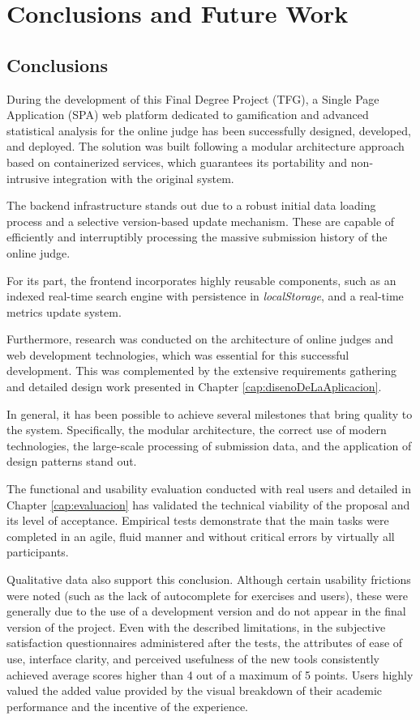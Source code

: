 \chapter{Conclusions and Future Work}
\label{cap:conclusions}

\section{Conclusions}

During the development of this Final Degree Project (TFG), a Single Page Application (SPA) web platform dedicated to gamification and advanced statistical analysis for the online judge \aer has been successfully designed, developed, and deployed. The solution was built following a modular architecture approach based on containerized services, which guarantees its portability and non-intrusive integration with the original \aer system.

The backend infrastructure stands out due to a robust initial data loading process and a selective version-based update mechanism. These are capable of efficiently and interruptibly processing the massive submission history of the online judge.

For its part, the frontend incorporates highly reusable components, such as an indexed real-time search engine with persistence in \textit{localStorage}, and a real-time metrics update system.

Furthermore, research was conducted on the architecture of online judges and web development technologies, which was essential for this successful development. This was complemented by the extensive requirements gathering and detailed design work presented in Chapter \ref{cap:disenoDeLaAplicacion}.

In general, it has been possible to achieve several milestones that bring quality to the system. Specifically, the modular architecture, the correct use of modern technologies, the large-scale processing of submission data, and the application of design patterns stand out.

The functional and usability evaluation conducted with real users and detailed in Chapter \ref{cap:evaluacion} has validated the technical viability of the proposal and its level of acceptance. Empirical tests demonstrate that the main tasks were completed in an agile, fluid manner and without critical errors by virtually all participants.

Qualitative data also support this conclusion. Although certain usability frictions were noted (such as the lack of autocomplete for exercises and users), these were generally due to the use of a development version and do not appear in the final version of the project. Even with the described limitations, in the subjective satisfaction questionnaires administered after the tests, the attributes of ease of use, interface clarity, and perceived usefulness of the new tools consistently achieved average scores higher than 4 out of a maximum of 5 points. Users highly valued the added value provided by the visual breakdown of their academic performance and the incentive of the experience.

